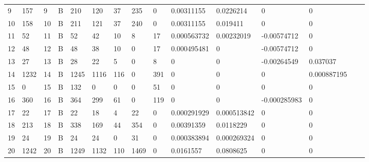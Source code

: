 \begin{longtable}{lllllllllllllll}
	9   & 157               & 9   & B   & 210               & 120               & 37                & 235  & 0          & 0.00311155     & 0.0226214      & 0             & 0            \\
	10  & 158               & 10  & B   & 211               & 121               & 37                & 240  & 0          & 0.00311155     & 0.019411       & 0             & 0            \\
	11  & 52                & 11  & B   & 52                & 42                & 10                & 8    & 17         & 0.000563732    & 0.00232019     & -0.00574712   & 0            \\
	12  & 48                & 12  & B   & 48                & 38                & 10                & 0    & 17         & 0.000495481    & 0              & -0.00574712   & 0            \\
	13  & 27                & 13  & B   & 28                & 22                & 5                 & 0    & 8          & 0              & 0              & -0.00264549   & 0.037037     \\
	14  & 1232              & 14  & B   & 1245              & 1116              & 116               & 0    & 391        & 0              & 0              & 0             & 0.000887195  \\
	15  & 0                 & 15  & B   & 132               & 0                 & 0                 & 0    & 51         & 0              & 0              & 0             & 0            \\
	16  & 360               & 16  & B   & 364               & 299               & 61                & 0    & 119        & 0              & 0              & -0.000285983  & 0            \\
	17  & 22                & 17  & B   & 22                & 18                & 4                 & 22   & 0          & 0.000291929    & 0.000513842    & 0             & 0            \\
	18  & 213               & 18  & B   & 338               & 169               & 44                & 354  & 0          & 0.00391359     & 0.0118229      & 0             & 0            \\
	19  & 24                & 19  & B   & 24                & 24                & 0                 & 31   & 0          & 0.000383894    & 0.000269324    & 0             & 0            \\
	20  & 1242              & 20  & B   & 1249              & 1132              & 110               & 1469 & 0          & 0.0161557      & 0.0808625      & 0             & 0            \\

\end{longtable}
